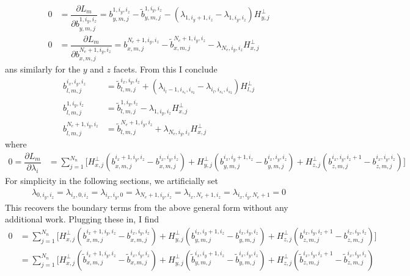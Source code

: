 \documentclass[12pt,a4paper]{article}
\newcommand{\pder}[2][]{\dfrac{\partial #1}{\partial #2}} %
\begin{document}
{\begin{align*}
0 &= \pder[L_m]{b^{1,i_y,i_z}_{y,m,j}} = b_{y,m,j}^{1,i_y,i_z}  -  \tilde{b}^{1,i_y,i_z}_{y,m,j}  - \left( \lambda_{1,i_y+1,i_z} - \lambda_{1,i_y,i_z}  \right)H_{y , j}^\bot  \\
0 &= \pder[L_m]{b^{N_e+1,i_y,i_z}_{x,m,j}} = b_{x,m,j}^{N_e+1,i_y,i_z}  -  \tilde{b}^{N_e+1,i_y,i_z}_{x,m,j}  - \lambda_{N_e,i_y,i_z} H_{x , j}^\bot  
\end{align*}
ans similarly for the $y$ and $z$ facets. From this I conclude
\begin{align*}
b_{l,m,j}^{i_x,i_y,i_z}  &=  \tilde{b}^{i_x,i_y,i_z}_{l,m,j}  + \left( \lambda_{i_l-1,i_{s_1},i_{s_2}} -  \lambda_{i_l,i_{s_1},i_{s_2}} \right) H_{l , j}^\bot  \\
b_{l,m,j}^{1,i_y,i_z}  &=  \tilde{b}^{1,i_y,i_z}_{l,m,j}  - \lambda_{1,i_y,i_z} H_{x , j}^\bot  \\
b_{l,m,j}^{N_e+1,i_y,i_z}  &=  \tilde{b}^{N_e+1,i_y,i_z}_{l,m,j}  + \lambda_{N_e,i_y,i_z} H_{x , j}^\bot 
\end{align*}
where
\begin{align*}
0 = \pder[L_m]{\lambda_i} &= \sum_{j=1}^{N_n} \Big[ H^\bot_{x,j} \left( b_{x,m,j}^{i_x+1,i_y,i_z} - b_{x,m,j}^{i_x,i_y,i_z} \right) + H^\bot_{y,j} \left( b_{y,m,j}^{i_x,i_y+1,i_z} - b_{y,m,j}^{i_x,i_y,i_z} \right) + H^\bot_{z,j} \left( b_{z,m,j}^{i_x,i_y,i_z+1} - b_{z,m,j}^{i_x,i_y,i_z} \right) \Big]
\end{align*}
For simplicity in the following sections, we artificially set 
\begin{align*}
 \lambda_{0,i_y,i_z} =  \lambda_{i_x,0,i_z} =  \lambda_{i_x,i_y,0} =   \lambda_{N_e+1,i_y,i_z} =  \lambda_{i_x,N_e+1,i_z} =  \lambda_{i_x,i_y,N_e+1} = 0
\end{align*}
This recovers the boundary terms from the above general form without any additional work. Plugging these in, I find
\begin{align*}
0 &= \sum_{j=1}^{N_n} \Big[ H^\bot_{x,j} \left( b_{x,m,j}^{i_x+1,i_y,i_z} - b_{x,m,j}^{i_x,i_y,i_z} \right) + H^\bot_{y,j} \left( b_{y,m,j}^{i_x,i_y+1,i_z} - b_{y,m,j}^{i_x,i_y,i_z} \right) + H^\bot_{z,j} \left( b_{z,m,j}^{i_x,i_y,i_z+1} - b_{z,m,j}^{i_x,i_y,i_z} \right) \Big] \\
&=  \sum_{j=1}^{N_n} \Big[ H^\bot_{x,j} \left( \tilde{b}_{x,m,j}^{i_x+1,i_y,i_z} - \tilde{b}_{x,m,j}^{i_x,i_y,i_z} \right) + H^\bot_{y,j} \left( \tilde{b}_{y,m,j}^{i_x,i_y+1,i_z} - \tilde{b}_{y,m,j}^{i_x,i_y,i_z} \right) + H^\bot_{z,j} \left( \tilde{b}_{z,m,j}^{i_x,i_y,i_z+1} - \tilde{b}_{z,m,j}^{i_x,i_y,i_z} \right) \\

\end{align*}}
\end{document}
